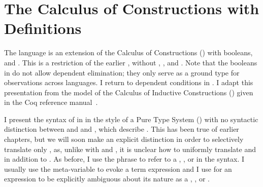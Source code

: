 \newcommand{\FigCOCLinking}[1][t]{
  \begin{figure}[#1]
    \begin{bnfgrammar}
      \bnflabel{Closing Substitutions} &
      \ssubst & \defeq & \cdot \bnfalt \ssubst[\sx \mapsto \se]
    \end{bnfgrammar}
    \judgshape{\wf{\slenv}{\ssubst}}
    \begin{mathpar}
      \inferrule
      {~}
      {\wf{\cdot}{\cdot}}

      \inferrule
      {\wf{\slenv}{\ssubst} \\
       \styjudg{\cdot}{\se}{\sA}}
      {\wf{\slenv,\sx:\sA}{\ssubst[\sx \mapsto \se]}}

      \inferrule
      {\wf{\slenv}{\ssubst} \\
       \styjudg{\slenv}{\se}{\sA}}
      {\wf{\slenv,\sx = \se : \sA}{\ssubst[\sx \mapsto \ssubst(\se)]}}
    \end{mathpar}
    \judgshape{\ssubst(\se) = \se}
    \begin{mathpar}
      \cdot(\se) = \se

      \ssubst[\sx \mapsto \sepr](\se) = \ssubst(\subst{\se}{\sx}{\sepr})
    \end{mathpar}
    \caption{\cpsslang Closing Substitutions and Linking}
  \end{figure}
}

\section{The Calculus of Constructions with Definitions}
\label{sec:cps:ecc}
\FigCOCSyntax

The language \cpsslang is an extension of the Calculus of
Constructions () with booleans,  and
.
This is a restriction of the earlier \slang, without , , and .
Note that the booleans in \cpsslang do not allow dependent elimination; they
only serve as a ground type for observations across languages.
I return to dependent conditions in .
I adapt this presentation from the model of the Calculus of Inductive
Constructions () given in the Coq reference manual~\cite[Chapter~4]{coq2017}.

I present the syntax of \cpsslang in  in the style
of a Pure Type System () with no syntactic distinction between
 and  and , which describe .
This has been true of earlier chapters, but we will soon make an explicit
distinction in order to selectively  translate only , as,
unlike with  and , it is unclear how to
uniformly  translate  and  in addition to
.
As before, I use the phrase  to refer to a ,
, or  in the  syntax.
I usually use the meta-variable \im{\se} to evoke a term expression and
I use \im{\st} for an expression to be explicitly ambiguous about its nature
as a , , or .

